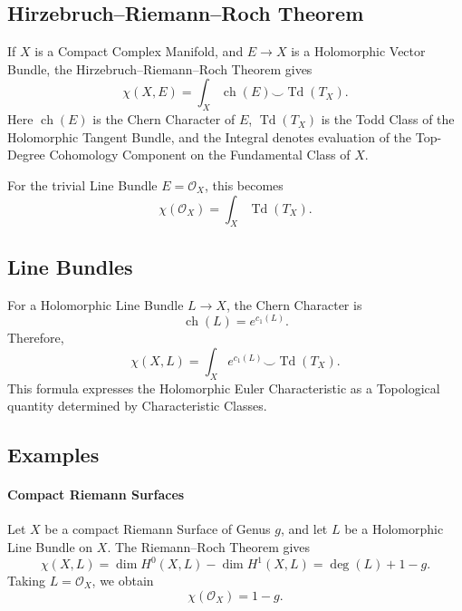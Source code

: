 \documentclass[a4paper, 10pt, onepage]{elegantbook}
\begin{document}
{\subsection{Hirzebruch--Riemann--Roch Theorem}

If \(X\) is a Compact Complex Manifold, and \(E\to X\) is a Holomorphic Vector Bundle, the Hirzebruch--Riemann--Roch Theorem gives
\begin{equation}
\boxed{
\chi(X,E)
=
\int_X
\operatorname{ch}(E)\smile\operatorname{Td}(T_X).
}
\end{equation}
Here \(\operatorname{ch}(E)\) is the Chern Character of \(E\), \(\operatorname{Td}(T_X)\) is the Todd Class of the Holomorphic Tangent Bundle, and the Integral denotes evaluation of the Top-Degree Cohomology Component on the Fundamental Class of \(X\).

For the trivial Line Bundle \(E=\mathcal{O}_X\), this becomes
\begin{equation}
\chi(\mathcal{O}_X)
=
\int_X \operatorname{Td}(T_X).
\end{equation}

\subsection{Line Bundles}

For a Holomorphic Line Bundle \(L\to X\), the Chern Character is
\[
\operatorname{ch}(L)=e^{c_1(L)}.
\]
Therefore,
\begin{equation}
\chi(X,L)
=
\int_X e^{c_1(L)}\smile\operatorname{Td}(T_X).
\end{equation}
This formula expresses the Holomorphic Euler Characteristic as a
Topological quantity determined by Characteristic Classes.

\subsection{Examples}

\paragraph{Compact Riemann Surfaces}

Let \(X\) be a compact Riemann Surface of Genus \(g\), and let \(L\) be a Holomorphic Line Bundle on \(X\). The Riemann--Roch Theorem gives
\begin{equation}
\chi(X,L)
=
\dim H^0(X,L)-\dim H^1(X,L)
=
\deg(L)+1-g.
\end{equation}
Taking \(L=\mathcal{O}_X\), we obtain
\begin{equation}
\chi(\mathcal{O}_X)=1-g.
\end{equation}

}
\end{document}
